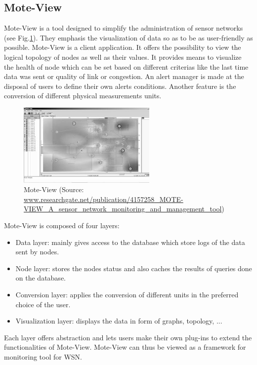 \subsection{Mote-View}

Mote-View \cite{turon2005mote} is a tool designed to simplify the administration of sensor networks (see Fig.\ref{fig:moteview}). They emphasis the visualization of data so as to be as user-friendly as possible. Mote-View is a client application. It offers the possibility to view the logical topology of nodes as well as their values. It provides  means to visualize the health of node which can be set based on different criterias like the last time data was sent or quality of link or congestion. An alert manager is made at the disposal of users to define their own alerts conditions. Another feature is the conversion of different physical measurements units. \\

\begin{figure}
  \centering
  \includegraphics[width=0.6\textwidth]{res/moteview.png}
  \caption{Mote-View (Source: \url{www.researchgate.net/publication/4157258_MOTE-VIEW_A_sensor_network_monitoring_and_management_tool})}
  \label{fig:moteview}
\end{figure}

Mote-View is composed of four layers:
\begin{itemize}
  \item Data layer: mainly gives access to the database which store logs of the data sent by nodes.
  \item Node layer: stores the nodes status and also caches the results of queries done on the database.
  \item Conversion layer: applies the conversion of different units in the preferred choice of the user.
  \item Visualization layer: displays the data in form of graphs, topology, ...
\end{itemize}

Each layer offers abstraction and lets users make their own plug-ins to extend the functionalities of Mote-View. Mote-View can thus be viewed as a framework for monitoring tool for WSN.

